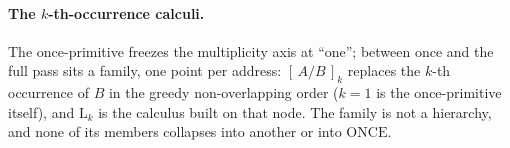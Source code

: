 
\paragraph{The $k$-th-occurrence calculi.}
The once-primitive freezes the multiplicity axis at ``one''; between
once and the full pass sits a family, one point per address:
$[\,A/B\,]_k$ replaces the $k$-th occurrence of $B$ in the greedy
non-overlapping order ($k = 1$ is the once-primitive itself), and
$\mathrm{L}_k$ is the calculus built on that node.  The family is not a
hierarchy, and none of its members collapses into another or into
$\mathrm{ONCE}$.

